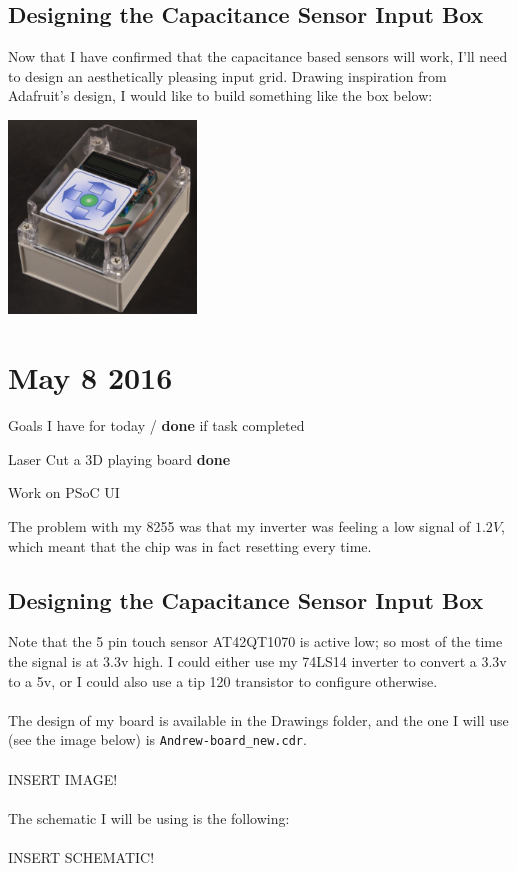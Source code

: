 \documentclass[12pt,twoside]{article}
\newenvironment{tight_itemize}{
\begin{itemize}
  \setlength{\itemsep}{0pt}
  \setlength{\parskip}{0pt}
}{\end{itemize}}
\begin{document}
\subsection{Designing the Capacitance Sensor Input Box}
Now that I have confirmed that the capacitance based sensors will work, I'll need to design an aesthetically pleasing input grid. Drawing inspiration from Adafruit's design, I would like to build something like the box below: 
\begin{center} \includegraphics[width = 50mm]{Pics/5-6c.jpg} \end{center}


\section{May 8 2016}

Goals I have for today / {\bf done} if task completed
\begin{tight_itemize}
\item Laser Cut a 3D playing board {\bf done}
\item Work on PSoC UI
\end{tight_itemize}

The problem with my 8255 was that my inverter was feeling a low signal of $1.2V$, which meant that the chip was in fact resetting every time. 

\subsection{Designing the Capacitance Sensor Input Box}
Note that the 5 pin touch sensor AT42QT1070 is active low; so most of the time the signal is at 3.3v high. I could either use my 74LS14 inverter to convert a 3.3v to a 5v, or I could also use a tip 120 transistor to configure otherwise. 
\\
\\ The design of my board is available in the Drawings folder, and the one I will use (see the image below) is \texttt{Andrew-board\_new.cdr}. 
\\ 
\\ INSERT IMAGE!
\\
\\ The schematic I will be using is the following:
\\
\\ INSERT SCHEMATIC!
\end{document}

